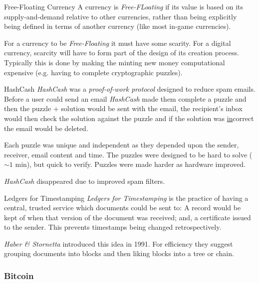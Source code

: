 \documentclass[11pt,a4paper]{article}
\begin{document}
  \begin{remark}{Free-Floating Currency}
    A currency is \textit{Free-FLoating} if its value is based on its supply-and-demand relative to other currencies, rather than being explicitly being defined in terms of another currency (like most in-game currencies).
    \par For a currency to be \textit{Free-Floating} it must have some scarity. For a digital currency, scarcity will have to form part of the design of its creation process. Typically this is done by making the minting new money computational expensive (e.g. having to complete cryptographic puzzles).
  \end{remark}

  \begin{definition}{HashCash}
    \textit{HashCash} was a \textit{proof-of-work protocol} designed to reduce spam emails. Before a user could send an email \textit{HashCash} made them complete a puzzle and then the puzzle + solution would be sent with the email, the recipient's inbox would then check the solution against the puzzle and if the solution was \underline{in}correct the email would be deleted.
    \par Each puzzle was unique and independent as they depended upon the sender, receiver, email content and time. The puzzles were designed to be hard to solve ($\sim1$ min), but quick to verify. Puzzles were made harder as hardware improved.
    \par \textit{HashCash} disappeared due to improved spam filters.
  \end{definition}

  \begin{definition}{Ledgers for Timestamping}
    \textit{Ledgers for Timestamping} is the practice of having a central, trusted service which documents could be sent to: A record would be kept of when that version of the document was received; and, a certificate issued to the sender. This prevents timestamps being changed retrospectively.
    \par \textit{Haber \& Stornetta} introduced this idea in 1991. For efficiency they suggest grouping documents into blocks and then liking blocks into a tree or chain.
  \end{definition}

\subsubsection{Bitcoin} \label{sec_Bitcoin}
\end{document}
